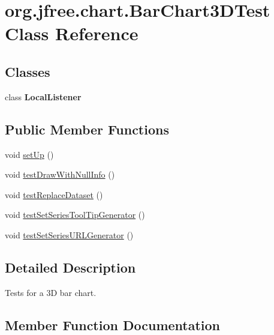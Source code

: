 \hypertarget{classorg_1_1jfree_1_1chart_1_1_bar_chart3_d_test}{}\section{org.\+jfree.\+chart.\+Bar\+Chart3\+D\+Test Class Reference}
\label{classorg_1_1jfree_1_1chart_1_1_bar_chart3_d_test}
\subsection*{Classes}
\begin{DoxyCompactItemize}
\item 
class {\bfseries Local\+Listener}
\end{DoxyCompactItemize}
\subsection*{Public Member Functions}
\begin{DoxyCompactItemize}
\item 
void \mbox{\hyperlink{classorg_1_1jfree_1_1chart_1_1_bar_chart3_d_test_ae317589ade375cb037e6f54302cb0cac}{set\+Up}} ()
\item 
void \mbox{\hyperlink{classorg_1_1jfree_1_1chart_1_1_bar_chart3_d_test_a9bbc3e11b754aa82807b2975fc2f9f5e}{test\+Draw\+With\+Null\+Info}} ()
\item 
void \mbox{\hyperlink{classorg_1_1jfree_1_1chart_1_1_bar_chart3_d_test_ad8202eabc7613c76363278f7fcc8058d}{test\+Replace\+Dataset}} ()
\item 
void \mbox{\hyperlink{classorg_1_1jfree_1_1chart_1_1_bar_chart3_d_test_a9b62e46a5ac1c52d6d9bd890d9870794}{test\+Set\+Series\+Tool\+Tip\+Generator}} ()
\item 
void \mbox{\hyperlink{classorg_1_1jfree_1_1chart_1_1_bar_chart3_d_test_af85e75c99539d37b05bd704038e997bc}{test\+Set\+Series\+U\+R\+L\+Generator}} ()
\end{DoxyCompactItemize}


\subsection{Detailed Description}
Tests for a 3D bar chart. 

\subsection{Member Function Documentation}
\mbox{\label{classorg_1_1jfree_1_1chart_1_1_bar_chart3_d_test_ae317589ade375cb037e6f54302cb0cac}} 
